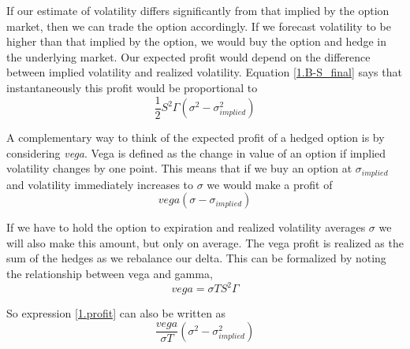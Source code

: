 \documentclass[11pt]{report}
\begin{document}
		If our estimate of volatility differs significantly from that implied by the option market, then we can trade the option accordingly. If we forecast volatility to be higher than that implied by the option, we would buy the option and hedge in the underlying market. Our expected profit would depend on the difference between implied volatility and realized volatility. Equation \eqref{1.B-S_final} says that instantaneously this profit would be proportional to
		\begin{equation}
			\frac{1}{2} S^2 \Gamma (\sigma^2 - \sigma^2_{implied})
			\label{1.profit}
		\end{equation}

		A complementary way to think of the expected profit of a hedged option is by considering \textit{vega}. Vega is defined as the change in value of an option if implied volatility changes by one point. This means that if we buy an option at $\sigma_{implied}$ and volatility immediately increases to $\sigma$ we would make a profit of
		\begin{equation}
			vega(\sigma - \sigma_{implied})
		\end{equation}

		If we have to hold the option to expiration and realized volatility averages $\sigma$ we will also make this amount, but only on average. The vega profit is realized as the sum of the hedges as we rebalance our delta. This can be formalized by noting the relationship between vega and gamma,
		\begin{equation}
			vega = \sigma T S^2 \Gamma
		\end{equation}

		So expression \eqref{1.profit} can also be written as
		\begin{equation}
			\frac{vega}{\sigma T} (\sigma^2 - \sigma^2_{implied})
		\end{equation}
\end{document}
